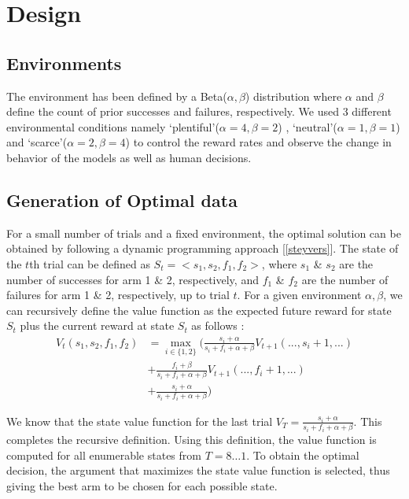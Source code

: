 \label{design}
\section{Design}

\subsection{Environments}
The environment has been defined by a Beta($\alpha,\beta$) distribution where $\alpha$ and $\beta$ define the count of prior successes and failures, respectively. We used 3 different environmental conditions namely ‘plentiful’($\alpha=4,\beta=2$) , ‘neutral’($\alpha=1,\beta=1$) and ‘scarce’($\alpha=2,\beta=4$) to control the reward rates and observe the change in behavior of the models as well as human decisions.

\subsection{Generation of Optimal data}
For a small number of trials and a fixed environment, the optimal solution can be obtained by following a dynamic programming approach [\ref{steyvers}]. The state of the $t$th trial can be defined as $S_t = <s_1,s_2,f_1,f_2>$, where $s_1$ \& $s_2$ are the number of successes for arm 1 \& 2, respectively, and $f_1$ \& $f_2$ are the number of failures for arm 1 \& 2, respectively, up to trial $t$. For a given environment $\alpha,\beta$, we can recursively define the value function as the expected future reward for state $S_t$ plus the current reward at state $S_t$ as follows : 
\begin{align*}
	V_t(s_1,s_2,f_1,f_2) &= \max_{i \in \{1,2\}} 
	\Big(
	\frac{s_i + \alpha}{s_i + f_i + \alpha + \beta} V_{t+1}(...,s_i+1,...) \\
	&+ \frac{f_i + \beta}{s_i + f_i + \alpha + \beta} V_{t+1}(...,f_i+1,...)\\
	&+ \frac{s_i + \alpha}{s_i + f_i + \alpha + \beta} 
	\Big)	
\end{align*}


We know that the state value function for the last trial $V_T=\frac{s_i + \alpha}{s_i + f_i + \alpha + \beta}$. This completes the recursive definition. Using this definition, the value function is computed for all enumerable states from $T=8\ldots1$. To obtain the optimal decision, the argument that maximizes the state value function is selected, thus giving the best arm to be chosen for each possible state. 

